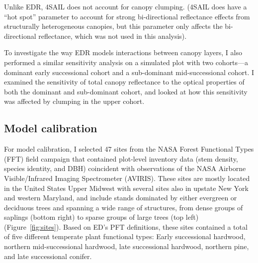 Unlike EDR, 4SAIL does not account for canopy clumping.
(4SAIL does have a ``hot spot'' parameter to account for strong bi-directional reflectance effects from structurally heterogeneous canopies, but this parameter only affects the bi-directional reflectance, which was not used in this analysis).

To investigate the way EDR models interactions between canopy layers, I also performed a similar sensitivity analysis on a simulated plot with two cohorts---a dominant early successional cohort and a sub-dominant mid-successional cohort.
I examined the sensitivity of total canopy reflectance to the optical properties of both the dominant and sub-dominant cohort, and looked at how this sensitivity was affected by clumping in the upper cohort.

\subsection{Model calibration}

For model calibration, I selected 47 sites from the NASA Forest Functional Types (FFT) field campaign that contained plot-level inventory data (stem density, species identity, and DBH) coincident with observations of the NASA Airborne Visible/Infrared Imaging Spectrometer (AVIRIS).
These sites are mostly located in the United States Upper Midwest with several sites also in upstate New York and western Maryland, and include stands dominated by either evergreen or deciduous trees and spanning a wide range of structures, from dense groups of saplings (bottom right) to sparse groups of large trees (top left) (Figure~\ref{fig:sites}).
Based on ED's PFT definitions, these sites contained a total of five different temperate plant functional types: Early successional hardwood, northern mid-successional hardwood, late successional hardwood, northern pine, and late successional conifer.


